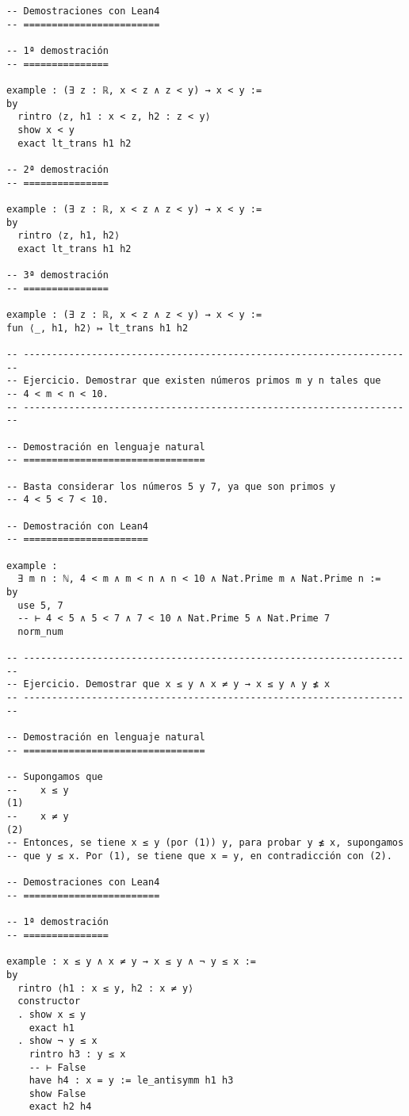 \begin{verbatim}
-- Demostraciones con Lean4
-- ========================

-- 1ª demostración
-- ===============

example : (∃ z : ℝ, x < z ∧ z < y) → x < y :=
by
  rintro ⟨z, h1 : x < z, h2 : z < y⟩
  show x < y
  exact lt_trans h1 h2

-- 2ª demostración
-- ===============

example : (∃ z : ℝ, x < z ∧ z < y) → x < y :=
by
  rintro ⟨z, h1, h2⟩
  exact lt_trans h1 h2

-- 3ª demostración
-- ===============

example : (∃ z : ℝ, x < z ∧ z < y) → x < y :=
fun ⟨_, h1, h2⟩ ↦ lt_trans h1 h2

-- ---------------------------------------------------------------------
-- Ejercicio. Demostrar que existen números primos m y n tales que
-- 4 < m < n < 10.
-- ---------------------------------------------------------------------

-- Demostración en lenguaje natural
-- ================================

-- Basta considerar los números 5 y 7, ya que son primos y
-- 4 < 5 < 7 < 10.

-- Demostración con Lean4
-- ======================

example :
  ∃ m n : ℕ, 4 < m ∧ m < n ∧ n < 10 ∧ Nat.Prime m ∧ Nat.Prime n :=
by
  use 5, 7
  -- ⊢ 4 < 5 ∧ 5 < 7 ∧ 7 < 10 ∧ Nat.Prime 5 ∧ Nat.Prime 7
  norm_num

-- ---------------------------------------------------------------------
-- Ejercicio. Demostrar que x ≤ y ∧ x ≠ y → x ≤ y ∧ y ≰ x
-- ---------------------------------------------------------------------

-- Demostración en lenguaje natural
-- ================================

-- Supongamos que
--    x ≤ y                                                          (1)
--    x ≠ y                                                          (2)
-- Entonces, se tiene x ≤ y (por (1)) y, para probar y ≰ x, supongamos
-- que y ≤ x. Por (1), se tiene que x = y, en contradicción con (2).

-- Demostraciones con Lean4
-- ========================

-- 1ª demostración
-- ===============

example : x ≤ y ∧ x ≠ y → x ≤ y ∧ ¬ y ≤ x :=
by
  rintro ⟨h1 : x ≤ y, h2 : x ≠ y⟩
  constructor
  . show x ≤ y
    exact h1
  . show ¬ y ≤ x
    rintro h3 : y ≤ x
    -- ⊢ False
    have h4 : x = y := le_antisymm h1 h3
    show False
    exact h2 h4


\end{verbatim}
